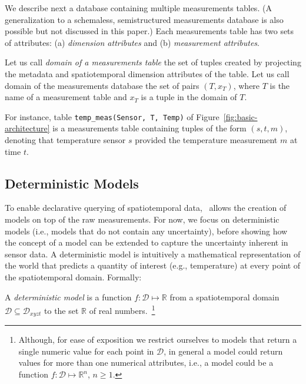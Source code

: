
We describe next a database containing multiple measurements tables. (A generalization to a schemaless, semistructured measurements database is also possible but not discussed in this paper.) Each measurements table has two sets of attributes: (a) {\em dimension attributes} and (b) {\em measurement attributes}. 

Let us call {\em domain of a measurements table} the set of tuples created by projecting  the metadata and spatiotemporal dimension attributes of the table. Let us call domain of the measurements database the set of pairs $(T, x_T)$, where $T$ is the name of a measurement table and $x_T$ is a tuple in the domain of $T$.


\begin{example}
For instance, table \texttt{temp\_meas(Sensor, T, Temp)} of Figure~\ref{fig:basic-architecture} is a measurements table containing tuples of the form $(s, t, m)$, denoting that temperature sensor $s$ provided the temperature measurement $m$ at time $t$.
\end{example}

\subsection{Deterministic Models}
\label{sec:deterministic-models}

To enable declarative querying of spatiotemporal data, \projName\ allows the creation of models on top of the raw measurements. For now, we focus on deterministic models (i.e., models that do not contain any uncertainty), before showing how the concept of a model can be extended to capture the uncertainty inherent in sensor data. A deterministic model is intuitively a mathematical representation of the world that predicts a quantity of interest (e.g., temperature) at every point of the spatiotemporal domain. Formally:

\begin{defin}
A {\em deterministic model} is a function $f:\mathcal{D}\mapsto \mathbb{R}$ from a spatiotemporal domain $\mathcal{D} \subseteq \mathcal{D}_{xyzt}$ to the set $\mathbb{R}$ of real numbers.~\footnote{Although, for ease of exposition we restrict ourselves to models that return a single numeric value for each point in $\mathcal{D}$, in general a model could return values for more than one numerical attributes, i.e., a model could be a function  $f:\mathcal{D}\mapsto \mathbb{R}^n$, $n \ge 1$.}
\end{defin}

